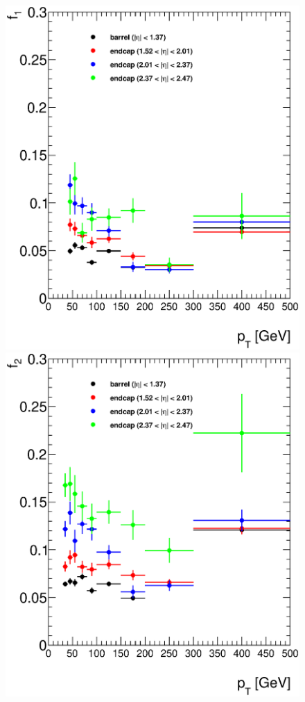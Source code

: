    \begin{figure}[h]
      \begin{center}
      \includegraphics[scale=0.41]{images/f1.eps}
      \includegraphics[scale=0.41]{images/f2.eps}

\end{center}
\end{figure}
